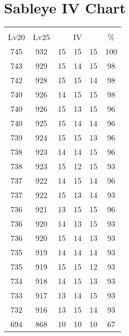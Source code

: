 \documentclass{article}%
\begin{document}
%
\normalsize%
\section{Sableye IV Chart}%
\label{sec:Sableye IV Chart}%
\renewcommand{\arraystretch}{1.5}%
\begin{tabular}{|c|c|c|c|c|c|}%
\hline%
\multicolumn{6}{|c|}{\textcolor{white}{ 
\linebreak{Sableye}
}%
\cellcolor{black}}\\%
\multicolumn{1}{|c}{Lv20}&\multicolumn{1}{c|}{Lv25}&\multicolumn{3}{c|}{IV}&\multicolumn{1}{|c|}{\%}\\%
\hline%
\rowcolor{color100}%
745&932&15&15&15&100\\%
\hline%
\rowcolor{color98}%
743&929&15&14&15&98\\%
\hline%
\rowcolor{color98}%
742&928&15&15&14&98\\%
\hline%
\rowcolor{color98}%
740&926&14&15&15&98\\%
\hline%
\rowcolor{color96}%
740&926&15&13&15&96\\%
\hline%
\rowcolor{color96}%
740&925&15&14&14&96\\%
\hline%
\rowcolor{color96}%
739&924&15&15&13&96\\%
\hline%
\rowcolor{color96}%
738&923&14&14&15&96\\%
\hline%
\rowcolor{color93}%
738&923&15&12&15&93\\%
\hline%
\rowcolor{color96}%
737&922&14&15&14&96\\%
\hline%
\rowcolor{color93}%
737&922&15&13&14&93\\%
\hline%
\rowcolor{color96}%
736&921&13&15&15&96\\%
\hline%
\rowcolor{color93}%
736&920&14&13&15&93\\%
\hline%
\rowcolor{color93}%
736&920&15&14&13&93\\%
\hline%
\rowcolor{color93}%
735&919&14&14&14&93\\%
\hline%
\rowcolor{color93}%
735&919&15&15&12&93\\%
\hline%
\rowcolor{color93}%
734&918&14&15&13&93\\%
\hline%
\rowcolor{color93}%
733&917&13&14&15&93\\%
\hline%
\rowcolor{color93}%
732&916&13&15&14&93\\%
\hline%
\rowcolor{color91}%
694&868&10&10&10&67\\%
\end{tabular}

%
\end{document}
